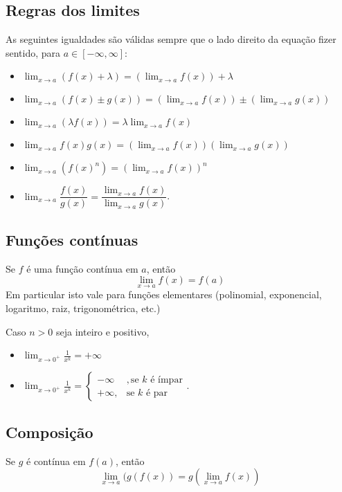 \subsection*{Regras dos limites}

As seguintes igualdades são válidas sempre que o lado direito da equação fizer sentido, para $a\in[-\infty,\infty]$:

\begin{itemize}
	\item $\lim_{x\to a}(f(x)+\lambda)=\left(\lim_{x\to a}f(x)\right)+\lambda$
	\item $\lim_{x\to a}\left(f(x)\pm g(x)\right)=\left(\lim_{x\to a}f(x)\right)\pm \left(\lim_{x\to a}g(x)\right)$
	\item $\lim_{x\to a}(\lambda f(x))=\lambda\lim_{x\to a}f(x)$
	\item $\lim_{x\to a}f(x)g(x)=\left(\lim_{x\to a}f(x)\right)\left(\lim_{x\to a}g(x)\right)$
	\item $\lim_{x\to a}\left(f(x)^n\right)=\left(\lim_{x\to a}f(x)\right)^n$
	\item $\lim_{x\to a}\dfrac{f(x)}{g(x)}=\dfrac{\lim_{x\to a}f(x)}{\lim_{x\to a}g(x)}$.
\end{itemize}

\subsection*{Funções contínuas}

Se $f$ é uma função contínua em $a$, então
\[\lim_{x\to a}f(x)=f(a)\]
Em particular isto vale para funções elementares (polinomial, exponencial, logaritmo, raiz, trigonométrica, etc.)

Caso $n>0$ seja inteiro e positivo,
\begin{itemize}
	\item $\lim_{x\to 0^+}\frac{1}{x^k}=+\infty$
	\item $\lim_{x\to 0^+}\frac{1}{x^k}=\begin{cases}-\infty&,\text{se }k\text{ é ímpar}\\+\infty,&\text{se }k\text{ é par}\end{cases}$.
\end{itemize}


\subsection*{Composição}

Se $g$ é contínua em $f(a)$, então
\[\lim_{x\to a}(g(f(x))=g(\lim_{x\to a}f(x))\]

